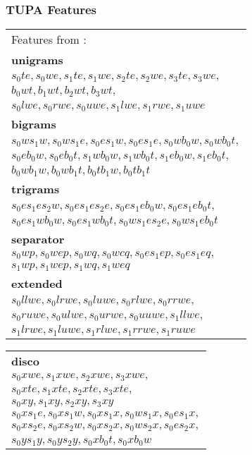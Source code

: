 \documentclass[t]{beamer}
\newcommand{\parser}[1]{TUPA\textsubscript{#1}}
\begin{document}
\begin{frame}
\frametitle{\parser{} Features}
\begin{adjustbox}{margin=3pt,frame}
\begin{tabular}{l}
{\footnotesize Features from \cite{zhang2009transition}:} \\
\textbf{unigrams} \\
$s_0te, s_0we, s_1te, s_1we, s_2te, s_2we, s_3te, s_3we,$ \\
$b_0wt, b_1wt, b_2wt, b_3wt,$ \\
$s_0lwe, s_0rwe, s_0uwe, s_1lwe, s_1rwe, s_1uwe$ \\
\textbf{bigrams} \\
$s_0ws_1w, s_0ws_1e, s_0es_1w, s_0es_1e, s_0wb_0w, s_0wb_0t,$ \\
$s_0eb_0w, s_0eb_0t, s_1wb_0w, s_1wb_0t, s_1eb_0w, s_1eb_0t,$ \\
$b_0wb_1w, b_0wb_1t, b_0tb_1w, b_0tb_1t$ \\
\textbf{trigrams} \\
$s_0es_1es_2w, s_0es_1es_2e, s_0es_1eb_0w, s_0es_1eb_0t,$ \\
$s_0es_1wb_0w, s_0es_1wb_0t, s_0ws_1es_2e, s_0ws_1eb_0t$ \\
\textbf{separator} \\
$s_0wp, s_0wep, s_0wq, s_0wcq, s_0es_1ep, s_0es_1eq,$ \\
$s_1wp, s_1wep, s_1wq, s_1weq$ \\

\textbf{extended} \footnotesize \cite{zhu2013fast} \\
$s_0llwe, s_0lrwe, s_0luwe, s_0rlwe, s_0rrwe,$ \\
$s_0ruwe, s_0ulwe, s_0urwe, s_0uuwe, s_1llwe,$ \\
$s_1lrwe, s_1luwe, s_1rlwe, s_1rrwe, s_1ruwe$ \\
\end{tabular}
\begin{tabular}{l}
\textbf{disco} \footnotesize \cite{maier2015discontinuous} \\
$s_0xwe, s_1xwe, s_2xwe, s_3xwe,$ \\
$s_0xte, s_1xte, s_2xte, s_3xte,$ \\
$s_0xy, s_1xy, s_2xy, s_3xy$ \\
$s_0xs_1e, s_0xs_1w, s_0xs_1x, s_0ws_1x, s_0es_1x,$ \\
$s_0xs_2e, s_0xs_2w, s_0xs_2x, s_0ws_2x, s_0es_2x,$ \\
$s_0ys_1y, s_0ys_2y, s_0xb_0t, s_0xb_0w$ \\


\end{tabular}
\end{adjustbox}
\end{frame}
\end{document}
